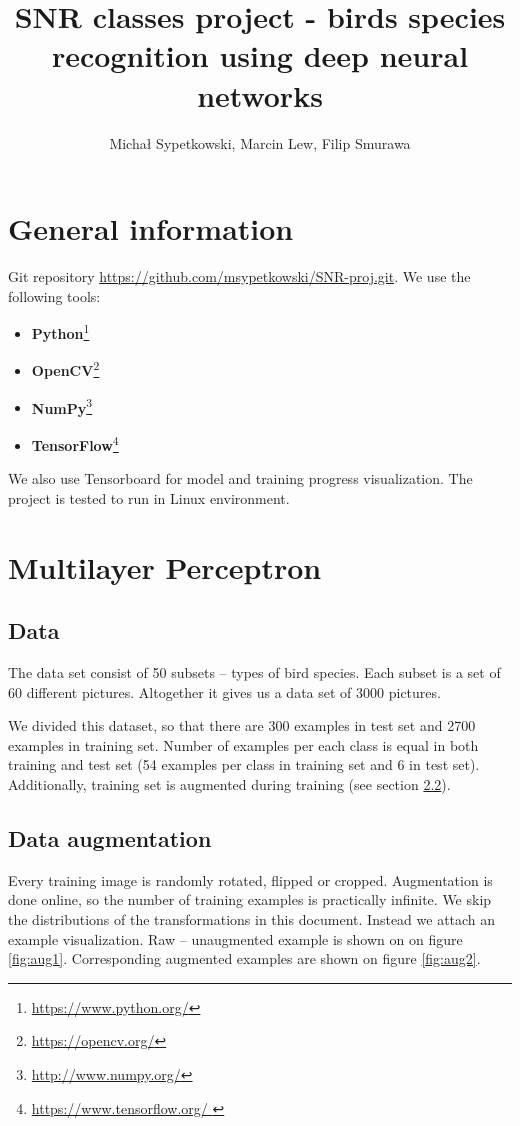 \documentclass[a4paper]{article}
\begin{document}
\title{SNR classes project - birds species recognition using deep neural networks}

\author{Michał Sypetkowski, Marcin Lew, Filip Smurawa}
\maketitle

\section{General information}
Git repository \url{https://github.com/msypetkowski/SNR-proj.git}.
We use the following tools:
\begin{itemize}
    \item \textbf{Python}\footnote{\url{https://www.python.org/}}
    \item \textbf{OpenCV}\footnote{\url{https://opencv.org/}}
    \item \textbf{NumPy}\footnote{\url{http://www.numpy.org/}}
    \item \textbf{TensorFlow}\footnote{\url{https://www.tensorflow.org/ }}
\end{itemize}
We also use Tensorboard for model and training progress visualization.
The project is tested to run in Linux environment.

\section{Multilayer Perceptron}

\subsection{Data}
The data set consist of 50 subsets -- types of bird species.
Each subset is a set of 60 different pictures.
Altogether it gives us a data set of 3000 pictures.

We divided this dataset, so that there are 300 examples in test set and
2700 examples in training set.
Number of examples per each class is equal in both training and test set
(54 examples per class in training set and 6 in test set).
Additionally, training set is augmented during training (see section \ref{augmentation}).


\subsection{Data augmentation}
\label{augmentation}
Every training image is randomly rotated, flipped or cropped.
Augmentation is done online, so the number of training examples is
practically infinite.
We skip the distributions of the transformations in this document.
Instead we attach an example visualization.
Raw -- unaugmented example is shown on on figure \ref{fig:aug1}.
Corresponding augmented examples are shown on figure \ref{fig:aug2}.
\end{document}
